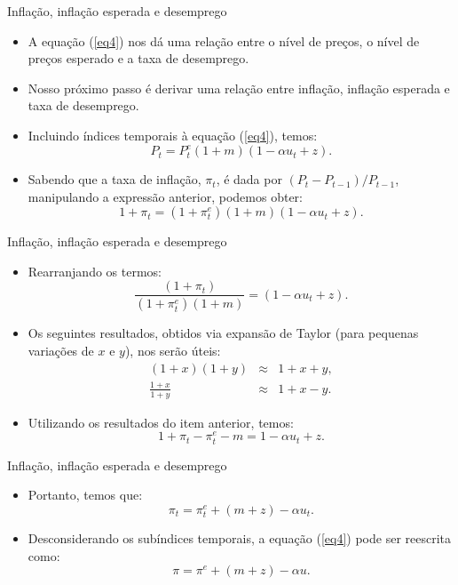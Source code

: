 \documentclass[10pt]{beamer}
\begin{document}
\begin{frame}{Inflação, inflação esperada e desemprego}
    \begin{itemize}
        \item A equação (\ref{eq4}) nos dá uma relação entre o nível de preços, o nível de preços esperado e a taxa de desemprego.
        \bigskip
        \item Nosso próximo passo é derivar uma relação entre inflação, inflação esperada e taxa de desemprego.
        \bigskip
        \item Incluindo índices temporais à equação (\ref{eq4}), temos:
        \[
        P_t = P^e_t (1 + m) (1-\alpha u_t + z).
        \]
        \bigskip
        \item Sabendo que a taxa de inflação, $\pi_t$, é dada por $(P_t - P_{t-1})/P_{t-1}$, manipulando a expressão anterior, podemos obter:
        \[
        1 + \pi_t = (1 + \pi_t^e)(1 + m)(1-\alpha u_t + z).
        \]
    \end{itemize}
\end{frame}

\begin{frame}{Inflação, inflação esperada e desemprego}
    \begin{itemize}
        \item Rearranjando os termos:
        \[
        \frac{(1 + \pi_t)}{(1 + \pi_t^e)(1 + m)} = (1-\alpha u_t + z).
        \]
        \bigskip
        \item Os seguintes resultados, obtidos via expansão de Taylor (para pequenas variações de $x$ e $y$), nos serão úteis:
        \begin{eqnarray*}
            (1 + x)(1 + y) &\approx& 1 + x + y, \\
            \frac{1 + x}{1 + y} &\approx& 1 + x - y.
        \end{eqnarray*}
        \bigskip
        \item Utilizando os resultados do item anterior, temos:
        \begin{equation*}
            1 + \pi_t - \pi_t^e - m = 1 - \alpha u_t + z.
        \end{equation*}
    \end{itemize}
\end{frame}

\begin{frame}{Inflação, inflação esperada e desemprego}
    \begin{itemize}
        \item Portanto, temos que:
        \begin{equation}
            \pi_t = \pi_t^e + (m + z) - \alpha u_t.
            \label{eq5}
        \end{equation}
        \bigskip
        \item Desconsiderando os subíndices temporais, a equação (\ref{eq4}) pode ser reescrita como:
        \begin{equation}
            \pi = \pi^e + (m + z) - \alpha u.
            \label{eq6}
        \end{equation}
    \end{itemize}
\end{frame}
\end{document}
